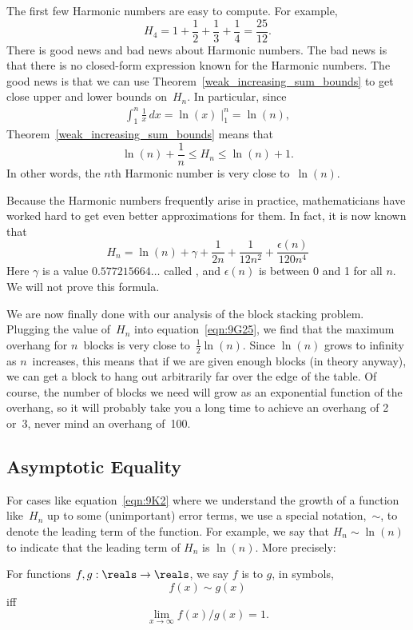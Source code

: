 The first few Harmonic numbers are easy to compute.  For example,
\[
    H_4 = 1 + \frac{1}{2} + \frac{1}{3} + \frac{1}{4} = \frac{25}{12}.
\]
There is good news and bad news about Harmonic numbers.  The bad news
is that there is no closed-form expression known for the Harmonic
numbers.  The good news is that we can use Theorem~\ref{weak_increasing_sum_bounds} to
get close upper and lower bounds on~$H_n$.  In particular, since
\begin{align*}
\int_1^n \frac{1}{x} \, dx
    = \ln(x) \; \Bigr|_1^n %
    = \ln(n),
\end{align*}
Theorem~\ref{weak_increasing_sum_bounds} means that
\begin{equation}\label{eqn:9G30}
    \ln(n) + \frac{1}{n} \le H_n \le \ln(n) + 1.
\end{equation}
In other words, the $n$th Harmonic number is very close to~$\ln(n)$.

Because the Harmonic numbers frequently arise in practice,
mathematicians have worked hard to get even better approximations for
them.  In fact, it is now known that
\begin{equation}\label{eqn:9K2}
    H_n = \ln(n) + \gamma + \frac{1}{2n} + \frac{1}{12n^2} +
        \frac{\epsilon(n)}{120n^4}
\end{equation}
Here $\gamma$ is a value $0.577215664\dots$ called , and $\epsilon(n)$ is between 0 and 1 for all $n$.  We
will not prove this formula.

We are now finally done with our analysis of the block stacking
problem.  Plugging the value of~$H_n$ into equation~\ref{eqn:9G25}, we
find that the maximum overhang for $n$~blocks is very close
to~$\frac{1}{2} \ln(n)$.  Since $\ln(n)$ grows to infinity as
$n$~increases, this means that if we are given enough blocks (in
theory anyway), we can get a block to hang out arbitrarily far over
the edge of the table.  Of course, the number of blocks we need will
grow as an exponential function of the overhang, so it will probably
take you a long time to achieve an overhang of 2 or~3, never mind an
overhang of~100.

\subsection{Asymptotic Equality}\label{sec:asymptotic_equality}

For cases like equation~\ref{eqn:9K2} where we understand the growth
of a function like~$H_n$ up to some (unimportant) error terms, we use
a special notation,~$\sim$, to denote the leading term of the
function.  For example, we say that $H_n \sim \ln(n)$ to indicate that
the leading term of $H_n$ is $\ln(n)$.  More precisely:
\begin{definition}\label{def:sim}
  For functions $f,g: \reals \to \reals$, we say $f$ is  to $g$, in symbols,
\[
f(x) \sim g(x)
\]
iff
\[
\lim_{x \rightarrow \infty} f(x)/g(x) = 1.
\]
\end{definition}

